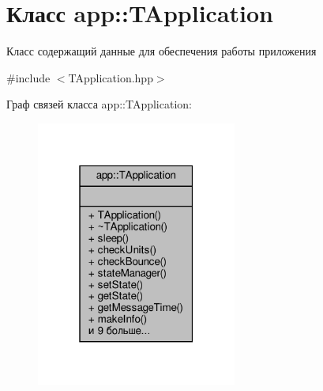 \hypertarget{classapp_1_1_t_application}{}\section{Класс app\+:\+:T\+Application}
\label{classapp_1_1_t_application}


Класс содержащий данные для обеспечения работы приложения  




{\ttfamily \#include $<$T\+Application.\+hpp$>$}



Граф связей класса app\+:\+:T\+Application\+:\nopagebreak
\begin{figure}[H]
\begin{center}
\leavevmode
\includegraphics[width=187pt]{classapp_1_1_t_application__coll__graph}
\end{center}
\end{figure}
